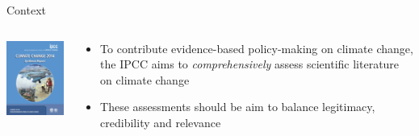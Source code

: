 \documentclass[9pt]{beamer}
\begin{document}
\begin{frame}{Context}

\begin{columns}
	\begin{column}{0.5\linewidth}
		\begin{center}
		\includegraphics[width=0.6\linewidth]{syrcover.png}
		\end{center}
	\end{column}
	\begin{column}{0.5\linewidth}
	\begin{center}
		\begin{itemize}
			\item To contribute evidence-based policy-making on climate change, the IPCC aims to \textit{comprehensively} assess scientific literature on climate change 
			\item These assessments should be aim to balance legitimacy, credibility and relevance \citep{Cash2001}
		\end{itemize}
	\end{center}
	\end{column}
	\end{columns}

\end{frame}
\end{document}
